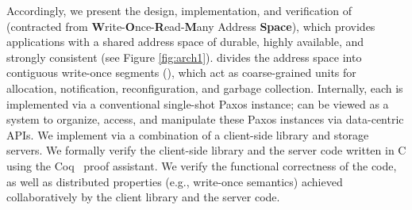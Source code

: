 Accordingly, we present the design, implementation, and verification of \sysname{} (contracted from \textbf{W}rite-\textbf{O}nce-\textbf{R}ead-\textbf{M}any Address \textbf{Space}), which provides applications with a shared address space of durable, highly available, and strongly consistent \WORs{} (see Figure \ref{fig:arch1}). \sysname{} divides the address space into contiguous write-once segments (\WOSes{}), which act as coarse-grained units for allocation, notification, reconfiguration, and garbage collection. Internally, each \WOR{} is implemented via a conventional single-shot Paxos instance; \sysname{} can be viewed as a system to organize, access, and manipulate these Paxos instances via data-centric APIs. We implement \sysname{} via a combination of a client-side library and storage servers. We formally verify the client-side library and the server code written in C using the Coq~\cite{coq} proof assistant. We verify the functional correctness of the code, as well as distributed properties (e.g., write-once semantics) achieved collaboratively by the client library and the server code. %


